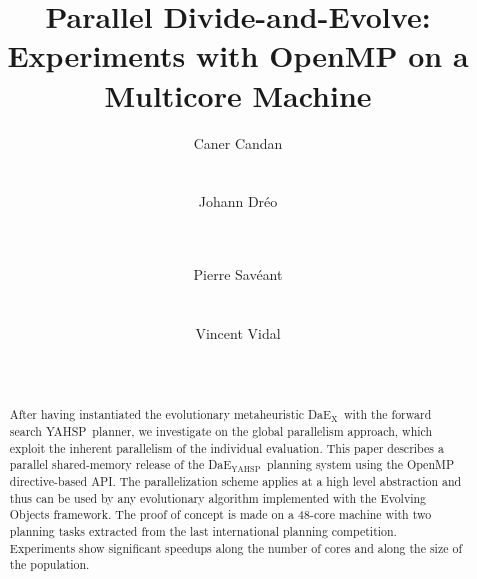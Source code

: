 \documentclass{sig-alternate}
\newcommand{\DAEX}{{\sc DaE$_{\text{X}}$}}
\newcommand{\DAEYAHSP}{{\sc DaE$_{\text{YAHSP}}$}}
\newcommand{\YAHSP}{{\sc YAHSP}}
\begin{document}
\title{Parallel Divide-and-Evolve: Experiments with OpenMP on a Multicore Machine}


\author{
\alignauthor
Caner Candan\\
       \\
       \\
\alignauthor
Johann Dr{\'e}o\\
       \\
       \\
\and
\alignauthor
Pierre Sav{\'e}ant\\
       \\
       \\
\alignauthor
Vincent Vidal\\
       \\
       \\
}

\maketitle
\begin{abstract}
After having instantiated the evolutionary metaheuristic \DAEX\ with the forward search \YAHSP\ planner, 
we investigate on the global parallelism approach, which exploit the inherent parallelism of the individual evaluation.
This paper describes a parallel shared-memory release of the \DAEYAHSP\ planning system using the OpenMP directive-based API.
The parallelization scheme applies at a high level abstraction and thus can be used by any evolutionary algorithm implemented with the Evolving Objects framework.
The proof of concept is made on a 48-core machine with two planning tasks extracted from the last international planning competition.
Experiments show significant speedups along the number of cores and along the size of the population.


\end{abstract}
\end{document}
